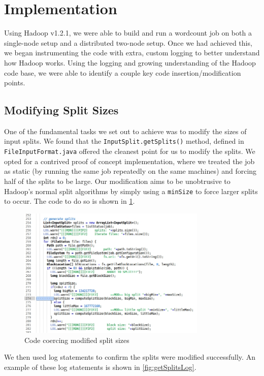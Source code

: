 \section{Implementation}
\label{section:implementation}
Using Hadoop v1.2.1, we were able to build and run a wordcount job
on both a single-node setup and a distributed two-node setup. Once
we had achieved this, we began instrumenting the code with extra,
custom logging to better understand how Hadoop works. Using the
logging and growing understanding of the Hadoop code base, we were
able to identify a couple key code insertion/modification points.

\subsection{Modifying Split Sizes}
One of the fundamental tasks we set out to achieve was to modify the
sizes of input splits. We found that the \texttt{InputSplit.getSplits()}
method, defined in \texttt{FileInputFormat.java} offered the cleanest
point for us to modify the splits. We opted for a contrived proof of
concept implementation, where we treated the job as static (by running
the same job repeatedly on the same machines) and forcing half of the
splits to be large. Our modification aims to be unobtrusive to Hadoop's
normal split algorithms by simply using a \texttt{minSize} to force larger
splits to occur. The code to do so is shown in \ref{fig:getSplitsCode}.

\begin{figure}[ht!]
\centering
\includegraphics[width=90mm]{getSplitsCode.jpg}
\caption{Code coercing modified split sizes}
\label{fig:getSplitsCode}
\end{figure}

We then used log statements to confirm the splits were modified successfully.
An example of these log statements is shown in \ref{fig:getSplitsLog}.

